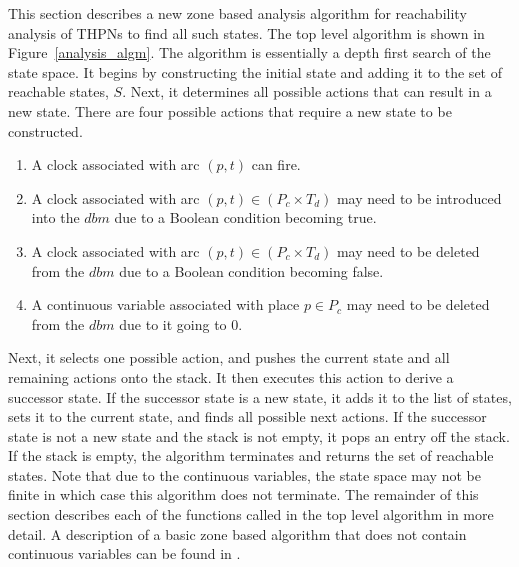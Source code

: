 \documentclass[11pt,times]{article}
\begin{document}
This section describes a new zone based analysis algorithm for reachability 
analysis of THPNs to find all such states.  The top level algorithm is shown 
in Figure~\ref{analysis_algm}.  The algorithm is essentially a depth first 
search of the state space.  It begins by constructing the initial state and
adding it to the set of reachable states, $S$.
Next, it determines all possible actions that can result in a new state.
There are four possible actions that require a new state to be constructed.
\begin{enumerate}
\item A clock associated with arc $(p,t)$ can fire.
\item A clock associated with arc $(p,t) \in (P_c \times T_d)$ may need to
      be introduced into the $dbm$ due to a Boolean condition becoming true.
\item A clock associated with arc $(p,t) \in (P_c \times T_d)$ may need to
      be deleted from the $dbm$ due to a Boolean condition becoming false.
\item A continuous variable associated with place $p \in P_c$ may need to
      be deleted from the $dbm$ due to it going to 0.
\end{enumerate}
Next, it selects one possible action, and pushes the current state and all 
remaining actions onto the stack.  It then executes this action to derive
a successor state.  If the successor state is a new state, it adds it to 
the list of states, sets it to the current state, and finds all possible next
actions.  If the successor state is not a new state and the stack is not
empty, it pops an entry off the stack.  If the stack is empty, the algorithm
terminates and returns the set of reachable states.  Note that due to the 
continuous variables, the state space may not be finite in which case this
algorithm does not terminate.  The remainder of this section describes each
of the functions called in the top level algorithm in more detail.
A description of a basic zone based algorithm that does not contain continuous
variables can be found in \cite{Myers2001b}.
\end{document}
